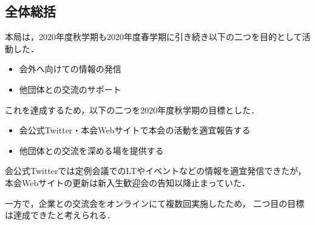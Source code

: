 \subsection*{全体総括}


本局は，2020年度秋学期も2020年度春学期に引き続き以下の二つを目的として活動した．
\begin{itemize}
    \item 会外へ向けての情報の発信
    \item 他団体との交流のサポート
\end{itemize}
これを達成するため，以下の二つを2020年度秋学期の目標とした．
\begin{itemize}
    \item 会公式Twitter・本会Webサイトで本会の活動を適宜報告する
    \item 他団体との交流を深める場を提供する
\end{itemize}

会公式Twitterでは定例会議でのLTやイベントなどの情報を適宜発信できたが，
本会Webサイトの更新は新入生歓迎会の告知以降止まっていた．

一方で，企業との交流会をオンラインにて複数回実施したため，
二つ目の目標は達成できたと考えられる．
